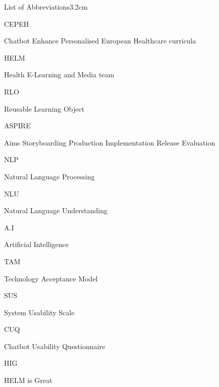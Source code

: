 \documentclass[a4paper, nobind]{templates/ociamthesis}
\begin{document}
\begin{romanpages}
\listoftables
  \mtcaddchapter
\begin{mclistof}{List of Abbreviations}{3.2cm}

\item[CEPEH]

Chatbot Enhance Personalised European Healthcare curricula

\item[HELM]

Health E-Learning and Media team

\item[RLO]

Reusable Learning Object

\item[ASPIRE]

Aims Storyboarding Production Implementation Release Evaluation

\item[NLP]

Natural Language Processing

\item[NLU]

Natural Language Understanding

\item[A.I]

Artificial Intelligence

\item[TAM]

Technology Acceptance Model

\item[SUS]

System Usability Scale

\item[CUQ]

Chatbot Usability Questionnaire

\item[HIG]

HELM is Great

\end{mclistof} 


\end{romanpages}
\end{document}
